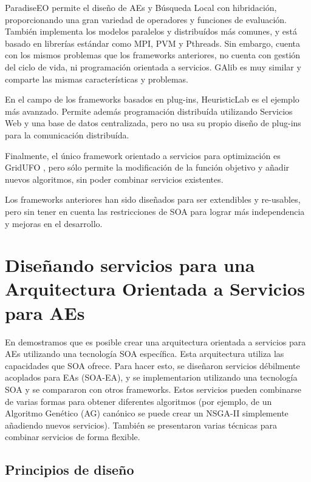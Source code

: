 \documentclass[runningheads]{llncs}
\begin{document}
ParadiseEO \cite{PARADISEO} permite el diseño de AEs y Búsqueda Local con hibridación, proporcionando una gran variedad de operadores y funciones de evaluación. También implementa los modelos paralelos y distribuídos más comunes, y está basado en librerías estándar como MPI, PVM y Pthreads. Sin embargo, cuenta con los mismos problemas que los frameworks anteriores, no cuenta con gestión del ciclo de vida, ni programación orientada a servicios. GAlib \cite{GALIB} es muy similar y comparte las mismas características y problemas. 

En el campo de los frameworks basados en plug-ins, HeuristicLab \cite{HEURISTICLAB} es el ejemplo más avanzado. Permite además programación distribuída utilizando Servicios Web y una base de datos centralizada, pero no usa su propio diseño de plug-ins para la comunicación distribuída.

Finalmente, el único framework orientado a servicios para optimización es GridUFO \cite{GRIDUFO}, pero sólo permite la modificación de la función objetivo y añadir nuevos algoritmos, sin poder combinar servicios existentes.

Los frameworks anteriores han sido diseñados para ser extendibles y
re-usables, pero sin tener en cuenta las restricciones de SOA para
lograr más independencia y mejoras en el desarrollo. %

\section{Diseñando servicios para una Arquitectura Orientada a Servicios para AEs}
\label{sec:design}

En \cite{OSGILIATH} demostramos que es posible crear una arquitectura orientada a servicios para AEs utilizando una tecnología SOA específica. Esta arquitectura utiliza las capacidades que SOA ofrece. Para hacer esto, se diseñaron servicios débilmente acoplados para EAs (SOA-EA), y se implementarion utilizando una tecnología SOA y se compararon con otros frameworks. Estos servicios pueden combinarse de varias formas para obtener diferentes algoritmos (por ejemplo, de un Algoritmo Genético (AG) canónico se puede crear un NSGA-II simplemente añadiendo nuevos servicios). También se presentaron varias técnicas para combinar servicios de forma flexible.


\subsection{Principios de diseño}
\end{document}
